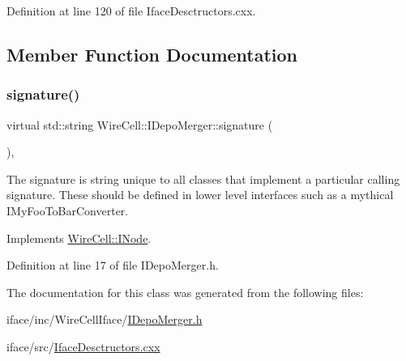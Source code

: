 Definition at line 120 of file Iface\+Desctructors.\+cxx.



\subsection{Member Function Documentation}
\mbox{\label{class_wire_cell_1_1_i_depo_merger_a8a14876da574b0a8ef6989e145188843}} 
\subsubsection{\texorpdfstring{signature()}{signature()}}
{\footnotesize\ttfamily virtual std\+::string Wire\+Cell\+::\+I\+Depo\+Merger\+::signature (\begin{DoxyParamCaption}{ }\end{DoxyParamCaption})\hspace{0.3cm}{\ttfamily [inline]}, {\ttfamily [virtual]}}

The signature is string unique to all classes that implement a particular calling signature. These should be defined in lower level interfaces such as a mythical I\+My\+Foo\+To\+Bar\+Converter. 

Implements \hyperlink{class_wire_cell_1_1_i_node_a0b0763465adf5ba7febe8e378162b584}{Wire\+Cell\+::\+I\+Node}.



Definition at line 17 of file I\+Depo\+Merger.\+h.



The documentation for this class was generated from the following files\+:\begin{DoxyCompactItemize}
\item 
iface/inc/\+Wire\+Cell\+Iface/\hyperlink{_i_depo_merger_8h}{I\+Depo\+Merger.\+h}\item 
iface/src/\hyperlink{_iface_desctructors_8cxx}{Iface\+Desctructors.\+cxx}\end{DoxyCompactItemize}
